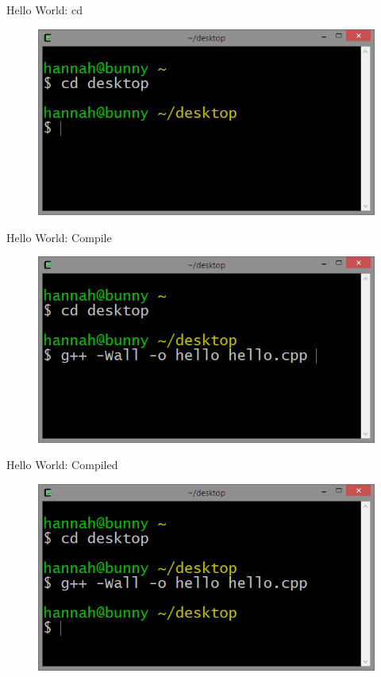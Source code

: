 \documentclass[xcolor={dvipsnames}]{beamer}
\begin{document}
\begin{frame}{Hello World: cd}
	\begin{figure}
			\includegraphics[width=1\textwidth]{cd}
	\end{figure}
\end{frame}

\begin{frame}{Hello World: Compile}
	\begin{figure}
			\includegraphics[width=1\textwidth]{compile}
	\end{figure}
\end{frame}

\begin{frame}{Hello World: Compiled}
	\begin{figure}
			\includegraphics[width=1\textwidth]{compiled}
	\end{figure}
\end{frame}
\end{document}
